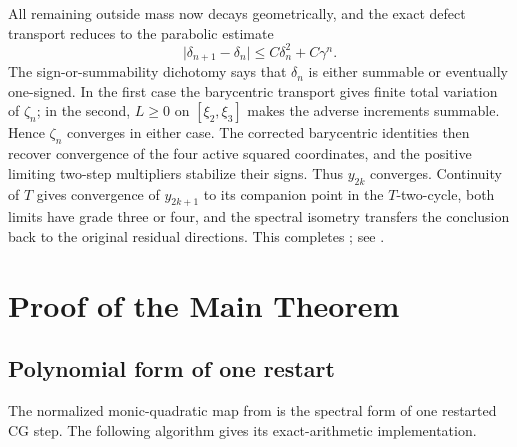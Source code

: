 \documentclass[11pt]{article}
\begin{document}
All remaining outside mass now decays geometrically, and the exact defect
transport reduces to the parabolic estimate
\[
 \lvert\delta_{n+1}-\delta_n\rvert
 \leq C\delta_n^2+C\gamma^n.
\]
The sign-or-summability dichotomy says that \(\delta_n\) is either
summable or eventually one-signed.  In the first case the barycentric
transport gives finite total variation of \(\zeta_n\); in the second,
\(L\geq0\) on \([\xi_2,\xi_3]\) makes the adverse increments summable.
Hence \(\zeta_n\) converges in either case.  The corrected barycentric
identities then recover convergence of the four active squared
coordinates, and the positive limiting two-step multipliers stabilize
their signs.  Thus \(y_{2k}\) converges.  Continuity of \(T\) gives
convergence of \(y_{2k+1}\) to its companion point in the \(T\)-two-cycle,
both limits have grade three or four, and the spectral isometry transfers
the conclusion back to the original residual directions.  This completes
; see
.

\section{Proof of the Main Theorem}
\label{sec:main-proof}

\subsection{Polynomial form of one restart}

The normalized monic-quadratic map from  is the
spectral form of one restarted CG step.  The following algorithm gives its
exact-arithmetic implementation.
\end{document}
